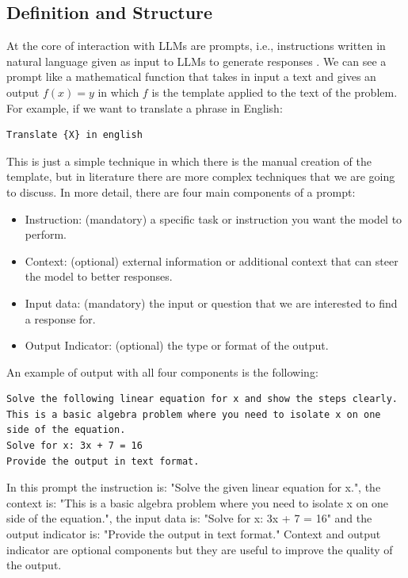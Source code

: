 \subsection{Definition and Structure}
At the core of interaction with LLMs are prompts, i.e., instructions written in natural language given as input to LLMs to generate responses \cite{llm_prompt}.
We can see a prompt like a mathematical function that takes in input a text and gives an output $f(x) = y$ in which $f$ is the template applied to the text of the problem.
For example, if we want to translate a phrase in English:
\begin{lstlisting}
Translate {X} in english
\end{lstlisting}
This is just a simple technique in which there is the manual creation of the template, but in literature there are more complex techniques that we are going to discuss.
In more detail, there are four main components of a prompt:
\begin{itemize}
    \item Instruction: (mandatory) a specific task or instruction you want the model to perform.
    \item Context: (optional) external information or additional context that can steer the model to better responses.
    \item Input data: (mandatory) the input or question that we are interested to find a response for.
    \item Output Indicator: (optional) the type or format of the output.
\end{itemize}

An example of output with all four components is the following:
\begin{lstlisting}
Solve the following linear equation for x and show the steps clearly. 
This is a basic algebra problem where you need to isolate x on one side of the equation.
Solve for x: 3x + 7 = 16
Provide the output in text format.
\end{lstlisting}
In this prompt the instruction is: "Solve the given linear equation for x.", the context is: "This is a basic algebra problem where you need to isolate x on one side of the equation.", the input data is: "Solve for x: 3x + 7 = 16" and the output indicator is: "Provide the output in text format."
Context and output indicator are optional components but they are useful to improve the quality of the output.

